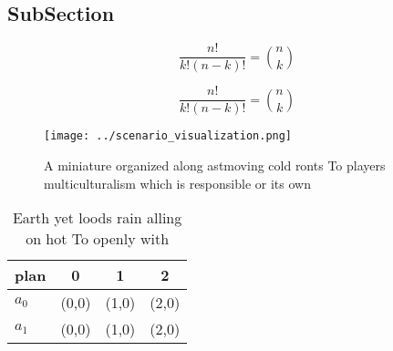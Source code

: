 \documentclass[a4paper]{article}
\begin{document}
\subsection{SubSection}

\[ \frac{n!}{k!(n-k)!} = \binom{n}{k} \]

\[ \frac{n!}{k!(n-k)!} = \binom{n}{k} \]

\begin{figure}
\centering
\texttt{[image: ../scenario\_visualization.png]}
\caption{A miniature organized along astmoving cold ronts To players multiculturalism which is responsible or its own 
}
\end{figure}
 
\begin{table}
\begin{adjustbox}{width=0.6\columnwidth}
\begin{tabular}{|l|l|l|l|}
\hline
\textbf{plan} & \multicolumn{1}{c|}{\textbf{0}} & \multicolumn{1}{c|}{\textbf{1}} & \multicolumn{1}{c|}{\textbf{2}} \\ \hline
\textbf{$a_0$}  & (0,0) & (1,0) & (2,0) \\ \hline
\textbf{$a_1$}  & (0,0) & (1,0) & (2,0) \\ \hline
\end{tabular}
\end{adjustbox}
\caption{Earth yet loods rain alling on hot To openly with
}
\end{table}
\end{document}
